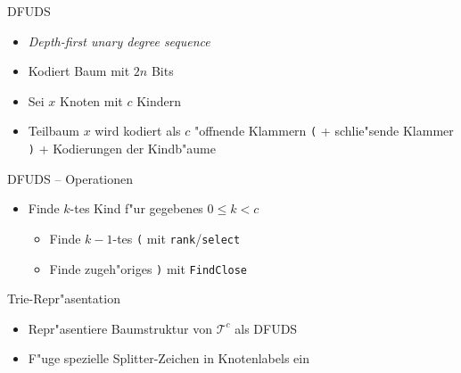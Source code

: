 \documentclass[ngerman,hyperref={pdfpagelabels=true}]{beamer}
\newcommand\T{\mathcal{T}}
\begin{document}
\begin{frame}{DFUDS}
\begin{itemize}
\item \emph{Depth-first unary degree sequence}
\item Kodiert Baum mit $2n$ Bits
\item Sei $x$ Knoten mit $c$ Kindern
\item Teilbaum $x$ wird kodiert als $c$ "offnende Klammern \lstinline|(| +
schlie"sende Klammer \lstinline|)| + Kodierungen der Kindb"aume
\end{itemize}
\vspace{1em}

\end{frame}

\begin{frame}{DFUDS -- Operationen}


\vspace{1em}

\begin{itemize}
\item Finde $k$-tes Kind f"ur gegebenes $0 \le k < c$
\begin{itemize}
\item Finde $k - 1$-tes \lstinline|(| mit \lstinline|rank|/\lstinline|select|
\item Finde zugeh"origes \lstinline|)| mit \lstinline|FindClose|
\end{itemize}
\end{itemize}
\end{frame}

\begin{frame}{Trie-Repr"asentation}

\begin{itemize}

\item Repr"asentiere Baumstruktur von $\T^c$ als DFUDS
\item F"uge spezielle Splitter-Zeichen in Knotenlabels ein
\end{itemize}

\centering



\end{frame}
\end{document}
